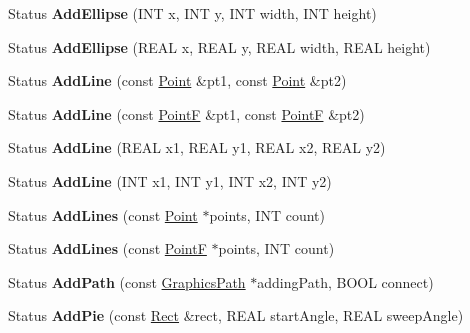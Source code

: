 \begin{DoxyCompactItemize}
Status {\bfseries Add\+Ellipse} (I\+NT x, I\+NT y, I\+NT width, I\+NT height)
\item 
\mbox{\label{class_graphics_path_ae38b99841e9336dc9647fe4dd3c16353}} 
Status {\bfseries Add\+Ellipse} (R\+E\+AL x, R\+E\+AL y, R\+E\+AL width, R\+E\+AL height)
\item 
\mbox{\label{class_graphics_path_a0966faffab2c6c39ded756a7b5786225}} 
Status {\bfseries Add\+Line} (const \hyperlink{struct_point}{Point} \&pt1, const \hyperlink{struct_point}{Point} \&pt2)
\item 
\mbox{\label{class_graphics_path_ac8ff4e6d1d8a1776973fb27192808767}} 
Status {\bfseries Add\+Line} (const \hyperlink{struct_point_f}{PointF} \&pt1, const \hyperlink{struct_point_f}{PointF} \&pt2)
\item 
\mbox{\label{class_graphics_path_ae7adbb3ac3bbad0f41f8f2b2017295c0}} 
Status {\bfseries Add\+Line} (R\+E\+AL x1, R\+E\+AL y1, R\+E\+AL x2, R\+E\+AL y2)
\item 
\mbox{\label{class_graphics_path_a32cd2d5454d75c07a08bbde8af1922d5}} 
Status {\bfseries Add\+Line} (I\+NT x1, I\+NT y1, I\+NT x2, I\+NT y2)
\item 
\mbox{\label{class_graphics_path_a2dad2bf4f3514c68b619a5242ed579ef}} 
Status {\bfseries Add\+Lines} (const \hyperlink{struct_point}{Point} $\ast$points, I\+NT count)
\item 
\mbox{\label{class_graphics_path_a471f6a65d52927b815bfb1f9b68cdabb}} 
Status {\bfseries Add\+Lines} (const \hyperlink{struct_point_f}{PointF} $\ast$points, I\+NT count)
\item 
\mbox{\label{class_graphics_path_a08c33fb17b8a85a628f3b92a67963843}} 
Status {\bfseries Add\+Path} (const \hyperlink{class_graphics_path}{Graphics\+Path} $\ast$adding\+Path, B\+O\+OL connect)
\item 
\mbox{\label{class_graphics_path_a5caf332d5f53dfc3a7e908719ce16772}} 
Status {\bfseries Add\+Pie} (const \hyperlink{struct_rect}{Rect} \&rect, R\+E\+AL start\+Angle, R\+E\+AL sweep\+Angle)

\end{DoxyCompactItemize}
